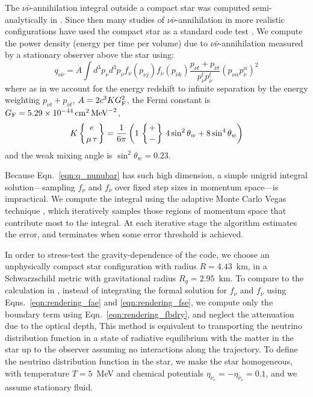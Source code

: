 \documentclass[aps,floatfix,prd,superscriptaddress,twocolumn]{revtex4-1}
\begin{document}
The $\nu \bar{\nu}$-annihilation integral outside a compact star was computed
semi-analytically in \cite{asan2000-nunubar}. Since then many studies of
$\nu \bar{\nu}$-annihilation in more realistic configurations have used the
compact star as a standard code test \cite{birk2007-nunubar,
  hari2010-gr_nunubar_collapsar,zala2011-nunubar}.
We compute the power density (energy per time per volume) due to
$\nu\bar{\nu}$-annihilation measured by a stationary observer above the star
using:
\begin{equation}
  \label{eqn:q_nunubar}
  q_{\nu\bar{\nu}} = A \int d^3p_{\nu} d^3p_{\bar{\nu}}
  f_{\nu}(p_{\nu j})f_{\bar{\nu}}(p_{\bar{\nu} k})
  \frac{p_{\nu t}+p_{\bar{\nu} t}}{p_{\nu}^t p_{\bar{\nu}}^t}
  (p_{\nu\alpha}p_{\bar{\nu}}^\alpha)^2
\end{equation}
where as in \cite{asan2000-nunubar} we account for the energy redshift to
infinite separation by the energy weighting $p_{\nu t}+p_{\bar{\nu} t}$,
$A=2 c^3 K G_{\rm F}^2$,
the Fermi constant is $G_{\rm F}=5.29\times10^{-44}\,{\rm cm}^2\,{\rm MeV}^{-2}$,
\begin{equation}
  K \left\{ {e \atop \mu\,\tau} \right\} = 
  \frac{1}{6\pi}
  \left(1 \, \left\{ {+ \atop -} \right\}
  \, 4 \sin^2 \theta_w + 8 \sin^4 \theta_w\right)
\end{equation}
and the weak mixing angle is $\sin^2\theta_w=0.23$.

Because Eqn.~\ref{eqn:q_nunubar} has such high dimension,
a simple unigrid integral solution---sampling $f_\nu$ and $f_{\bar{\nu}}$
over fixed step sizes in momentum space---is impractical.
We compute the integral using the adaptive Monte Carlo Vegas technique
\cite{pres2007-nr_3rd_ed},
which iteratively samples those regions of momentum space that contribute
most to the integral. At each iterative stage the algorithm estimates the
error, and terminates when some error threshold is achieved.

In order to stress-test the gravity-dependence of the code,
we choose an unphysically compact star configuration with
radius $R=4.43$~km,
in a Schwarzschild metric with
gravitational radius $R_g=2.95$~km.
To compare to the calculation in \cite{asan2000-nunubar},
instead of integrating the formal solution for $f_\nu$ and $f_{\bar{\nu}}$
using Eqns.~\ref{eqn:rendering_fae} and \ref{eqn:rendering_fse},
we compute only the boundary term using Eqn.~\ref{eqn:rendering_fbdry},
and neglect the attenuation due to the optical depth,
This method is equivalent to transporting the neutrino distribution function
in a state of radiative equilibrium with the matter in the star
up to the observer assuming no interactions along the trajectory.
To define the neutrino distribution function in the star,
we make the star homogeneous, with
temperature $T=5$~MeV and
chemical potentials $\eta_{\nu_e}=-\eta_{\bar{\nu}_e}=0.1$,
and we assume stationary fluid.
\end{document}
